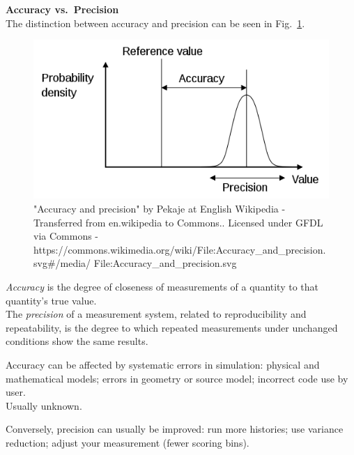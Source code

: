 \documentclass[12pt]{article}
\begin{document}
\textbf{Accuracy vs.\ Precision}\\
The distinction between accuracy and precision can be seen in Fig.~\ref{fig:accuracy}.\\
%
\begin{figure}[h!]
\begin{center}
  \includegraphics[height=2 in,clip]{../figs/accuracy-and-precision}
\end{center}
  \caption{"Accuracy and precision" by Pekaje at English Wikipedia - Transferred from en.wikipedia to Commons.. Licensed under GFDL via Commons - https://commons.wikimedia.org/wiki/File:Accuracy\_and\_precision.svg\#/media/
  File:Accuracy\_and\_precision.svg}
  \label{fig:accuracy}
\end{figure}
%
\textit{Accuracy} is the degree of closeness of measurements of a quantity to that quantity's true value.\\
The \textit{precision} of a measurement system, related to reproducibility and repeatability, is the degree to which repeated measurements under unchanged conditions show the same results.

Accuracy can be affected by systematic errors in simulation: physical and mathematical models; errors in geometry or source model; incorrect code use by user.\\
Usually unknown.

Conversely, precision can usually be improved: run more histories; use variance reduction; adjust your measurement (fewer scoring bins).
\end{document}
